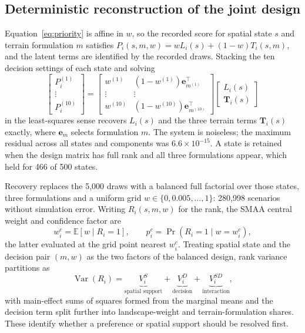\subsection{Deterministic reconstruction of the joint design}
Equation~\eqref{eq:priority} is affine in $w$, so the recorded score for spatial
state $s$ and terrain formulation $m$ satisfies
$P_i(s,m,w)=wL_i(s)+(1-w)T_i(s,m)$, and the latent terms are identified by the
recorded draws. Stacking the ten decision settings of each state and solving
\begin{equation}\label{eq:affine}
\begin{bmatrix}P_i^{(1)}\\ \vdots\\ P_i^{(10)}\end{bmatrix}
=\begin{bmatrix}
w^{(1)} & (1-w^{(1)})\mathbf e_{m^{(1)}}^{\top}\\
\vdots & \vdots\\
w^{(10)} & (1-w^{(10)})\mathbf e_{m^{(10)}}^{\top}
\end{bmatrix}
\begin{bmatrix}L_i(s)\\ \mathbf T_i(s)\end{bmatrix}
\end{equation}
in the least-squares sense recovers $L_i(s)$ and the three terrain terms
$\mathbf T_i(s)$ exactly, where $\mathbf e_m$ selects formulation $m$. The system
is noiseless; the maximum residual across all states and components was
$6.6\times10^{-15}$. A state is retained when the design matrix has full rank and
all three formulations appear, which held for 466 of 500 states.

Recovery replaces the 5,000 draws with a balanced full factorial over those
states, three formulations and a uniform grid $w\in\{0,0.005,\dots,1\}$: 280,998
scenarios without simulation error. Writing $R_i(s,m,w)$ for the rank, the SMAA
central weight and confidence factor \citep{lahdelma2001smaa} are
\begin{equation}\label{eq:central}
w_i^{c}=\mathbb E\!\left[w \mid R_i=1\right],\qquad
p_i^{c}=\Pr\!\left(R_i=1 \mid w=w_i^{c}\right),
\end{equation}
the latter evaluated at the grid point nearest $w_i^{c}$. Treating spatial state
and the decision pair $(m,w)$ as the two factors of the balanced design, rank
variance partitions as
\begin{equation}\label{eq:vardecomp}
\operatorname{Var}(R_i)=\underbrace{V_i^{S}}_{\text{spatial support}}
+\underbrace{V_i^{D}}_{\text{decision}}
+\underbrace{V_i^{SD}}_{\text{interaction}},
\end{equation}
with main-effect sums of squares formed from the marginal means
\citep{helton2006sensitivity} and the decision term split further into
landscape-weight and terrain-formulation shares. These identify whether a preference or spatial support should be resolved first.

